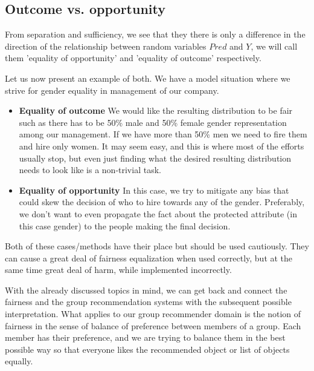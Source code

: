 \subsection{Outcome vs. opportunity}
From separation and sufficiency, we see that they there is only a difference in the direction of the relationship between random variables $Pred$ and $Y$, we will call them 'equality of opportunity' and 'equality of outcome' respectively.

Let us now present an example of both. We have a model situation where we strive for gender equality in management of our company.

\begin{itemize}

    \item \textbf{Equality of outcome}
    We would like the resulting distribution to be fair such as there has to be 50\% male and 50\% female gender representation among our management. If we have more than 50\% men we need to fire them and hire only women. It may seem easy, and this is where most of the efforts usually stop, but even just finding what the desired resulting distribution needs to look like is a non-trivial task.
    \item \textbf{Equality of opportunity}
    In this case, we try to mitigate any bias that could skew the decision of who to hire towards any of the gender. Preferably, we don't want to even propagate the fact about the protected attribute (in this case gender) to the people making the final decision.
    
\end{itemize}


Both of these cases/methods have their place but should be used cautiously. They can cause a great deal of fairness equalization when used correctly, but at the same time great deal of harm, while implemented incorrectly.


With the already discussed topics in mind, we can get back and connect the fairness and the group recommendation systems with the subsequent possible interpretation. What applies to our group recommender domain is the notion of fairness in the sense of balance of preference between members of a group. Each member has their preference, and we are trying to balance them in the best possible way so that everyone likes the recommended object or list of objects equally.

